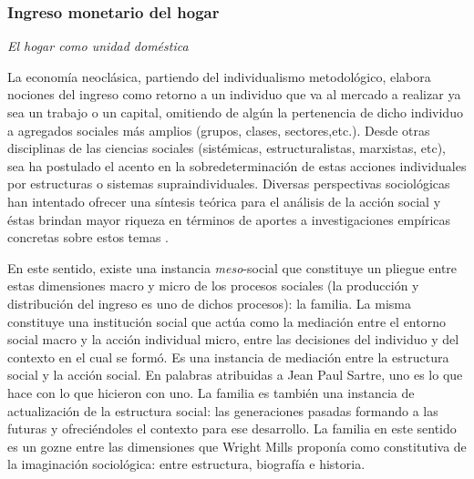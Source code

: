 \subsubsection{Ingreso monetario del hogar}
	
\textit{El hogar como unidad doméstica}
	
La economía neoclásica, partiendo del individualismo metodológico, elabora nociones del ingreso como retorno a un individuo que va al mercado a realizar ya sea un trabajo o un capital, omitiendo de algún la pertenencia de dicho individuo a agregados sociales más amplios (grupos, clases, sectores,etc.). Desde otras disciplinas de las ciencias sociales (sistémicas, estructuralistas, marxistas, etc), sea ha postulado el acento en la sobredeterminación de estas acciones individuales por estructuras o sistemas supraindividuales. Diversas perspectivas sociológicas han intentado ofrecer una síntesis teórica para el análisis de la acción social \cite{bourdieu1991,bourdieu2001} y éstas brindan mayor riqueza en términos de aportes a investigaciones empíricas concretas sobre estos temas \cite{soja}.
	
En este sentido, existe una instancia \textit{meso}-social que constituye un pliegue entre estas dimensiones macro y micro de los procesos sociales (la producción y distribución del ingreso es uno de dichos procesos): la familia. La misma constituye una institución social que actúa como la mediación entre el entorno social macro y la acción individual micro, entre las decisiones del individuo y del contexto en el cual se formó. Es una instancia de mediación entre la estructura social y la acción social. En palabras atribuidas a Jean Paul Sartre, uno es lo que hace con lo que hicieron con uno. La familia es también una instancia de actualización de la estructura social: las generaciones pasadas formando a las futuras y ofreciéndoles el contexto para ese desarrollo. La familia en este sentido es un gozne entre las dimensiones que Wright Mills \citeyear{wrightmills} proponía como constitutiva de la imaginación sociológica: entre estructura, biografía e historia.
	

